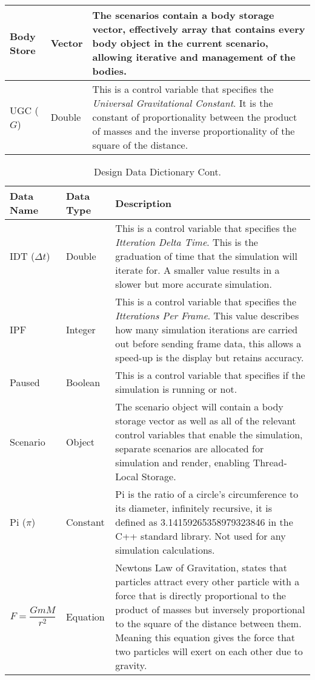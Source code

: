 \begin{table}[H]
\begin{tabular}{|M{3cm}|M{3cm}|m{8cm}|}
Body Store & Vector & The scenarios contain a body storage vector, effectively array that contains every body object in the current scenario, allowing iterative and management of the bodies. \\ \hline
UGC ($G$) & Double & This is a control variable that specifies the \textit{Universal Gravitational Constant}. It is the constant of proportionality between the product of masses and the inverse proportionality of the square of the distance. \\ \hline
\end{tabular}
\end{table} 

\begin{table}[H]
\caption{Design Data Dictionary Cont.}
\centering
\footnotesize
\def\arraystretch{1.5}
\begin{tabular}{|M{3cm}|M{3cm}|m{8cm}|}
\hline 
\textbf{Data Name} & \textbf{Data Type} & \textbf{Description} \\ \hline
IDT ($\Delta t$) & Double & This is a control variable that specifies the \textit{Itteration Delta Time}. This is the graduation of time that the simulation will iterate for. A smaller value results in a slower but more accurate simulation. \\ \hline
IPF & Integer & This is a control variable that specifies the \textit{Itterations Per Frame}. This value describes how many simulation iterations are carried out before sending frame data, this allows a speed-up is the display but retains accuracy. \\ \hline
Paused & Boolean & This is a control variable that specifies if the simulation is running or not. \\ \hline
Scenario & Object & The scenario object will contain a body storage vector as well as all of the relevant control variables that enable the simulation, separate scenarios are allocated for simulation and render, enabling Thread-Local Storage. \\ \hline
Pi ($\pi$)& Constant & Pi is the ratio of a circle's circumference to its diameter, infinitely recursive, it is defined as 3.14159265358979323846 in the C++ standard library. Not used for any simulation calculations. \\ \hline
$$F=\frac{GmM}{r^2}$$ & Equation & Newtons Law of Gravitation, states that particles attract every other particle with a force that is directly proportional to the product of masses but inversely proportional to the square of the distance between them. Meaning this equation gives the force that two particles will exert on each other due to gravity. \\ \hline

\end{tabular}
\end{table}
